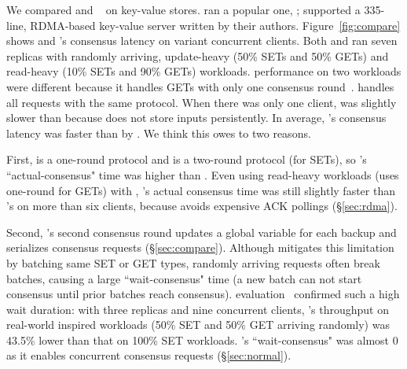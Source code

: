 We compared \xxx and \dare~\cite{dare:hpdc15} on key-value stores. \xxx ran a 
popular one, \redis; \dare supported a 335-line, RDMA-based key-value 
server written by their authors. Figure~\ref{fig:compare} shows \xxx and 
\dare's consensus latency on variant concurrent clients. Both \xxx and \dare ran 
seven replicas with randomly arriving, update-heavy (50\% SETs and 50\% GETs) 
and read-heavy (10\% SETs and 90\% GETs) workloads. \dare performance on two 
workloads were different because it handles GETs with only one consensus 
round~\cite{dare:hpdc15}. \xxx handles all requests with the same protocol. When 
there was only one client, \xxx was slightly slower than \dare because \dare 
does not store inputs persistently. In average, \xxx's 
consensus latency was faster than \dare by \fasterDARE. We think this owes to 
two reasons.






First, \xxx is a one-round protocol and \dare is a two-round protocol (for 
SETs), so \dare's ``actual-consensus" time was \fasterDAREconsensusonly higher 
than \xxx. Even using read-heavy workloads (\dare uses one-round for GETs) 
with \xxx, \xxx's actual consensus time was still slightly faster than \dare's 
on more than six clients, because \xxx avoids expensive ACK 
pollings (\S\ref{sec:rdma}).

Second, \dare's second consensus round updates a global variable for each 
backup and serializes consensus requests (\S\ref{sec:compare}). 
Although \dare mitigates this limitation by batching same SET or GET types, 
randomly arriving requests often break batches, causing a large 
``wait-consensus" time (a new batch can not start consensus until prior batches 
reach consensus). \dare evaluation~\cite{dare:hpdc15} confirmed such a high 
wait duration: with three replicas and nine concurrent clients, \dare's 
throughput on real-world inspired workloads (50\% SET and 50\% GET arriving 
randomly) was 43.5\% lower than that on 100\% SET workloads. \xxx's 
``wait-consensus" was almost 0 as it enables concurrent consensus requests 
(\S\ref{sec:normal}).

